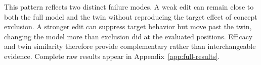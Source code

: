 This pattern reflects two distinct failure modes. A weak edit can remain close
to both the full model and the twin without reproducing the target effect of
concept exclusion. A stronger edit can suppress target behavior but move past
the twin, changing the model more than exclusion did at the evaluated
positions. Efficacy and twin similarity therefore provide complementary rather
than interchangeable evidence. Complete raw results appear in
Appendix~\ref{app:full-results}.
